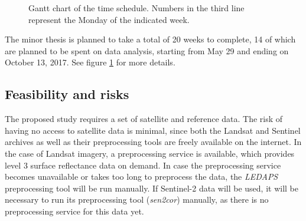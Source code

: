 \documentclass[a4paper,10pt]{article}
\begin{document}
\begin{figure}
  \caption{Gantt chart of the time schedule. Numbers in the third line represent the Monday of the indicated week.}
  \label{fig-gantt}
\end{figure}

The minor thesis is planned to take a total of 20 weeks to complete, 14 of which are planned to be spent on data analysis, starting from May 29 and ending on October 13, 2017. See figure \ref{fig-gantt} for more details.

\subsection{Feasibility and risks}

The proposed study requires a set of satellite and reference data. The risk of having no access to satellite data is minimal, since both the Landsat and Sentinel archives as well as their preprocessing tools are freely available on the internet. In the case of Landsat imagery, a preprocessing service is available, which provides level 3 surface reflectance data on demand. In case the preprocessing service becomes unavailable or takes too long to preprocess the data, the \textit{LEDAPS} preprocessing tool will be run manually. If Sentinel-2 data will be used, it will be necessary to run its preprocessing tool (\textit{sen2cor}) manually, as there is no preprocessing service for this data yet.
\end{document}
